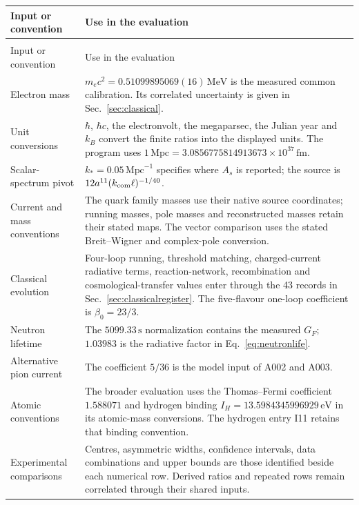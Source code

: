 \documentclass[aps,prx,onecolumn,10pt,notitlepage,nofootinbib,longbibliography]{revtex4-2}
\numberwithin{equation}{section}
\numberwithin{table}{section}
\newcommand{\MeV}{\,\mathrm{MeV}}
\newcommand{\eV}{\,\mathrm{eV}}
\newcommand{\fm}{\,\mathrm{fm}}
\begin{document}
\begingroup\small
\setlength{\tabcolsep}{4pt}
\setlength{\LTpre}{3pt}
\begin{longtable}{@{}>{\raggedright\arraybackslash}p{}>{\raggedright\arraybackslash}p{}@{}}
\toprule Input or convention&Use in the evaluation\\\midrule
\endfirsthead
\multicolumn{2}{l}{\textit{Input record, continued}}\\
\toprule Input or convention&Use in the evaluation\\\midrule
\endhead
\bottomrule\endfoot
Electron mass&$m_ec^2=0.51099895069(16)\MeV$ is the measured common calibration. Its correlated uncertainty is given in Sec.~\ref{sec:classical}.\\[3pt]
Unit conversions&$\hbar$, $\hbar c$, the electronvolt, the megaparsec, the Julian year and $k_B$ convert the finite ratios into the displayed units. The program uses $1\,\mathrm{Mpc}=3.0856775814913673\times10^{37}\fm$.\\[3pt]
Scalar-spectrum pivot&$k_*=0.05\,\mathrm{Mpc}^{-1}$ specifies where $A_s$ is reported; the source is $12a^{11}(k_{\rm com}\ell)^{-1/40}$.\\[3pt]
Current and mass conventions&The quark family masses use their native source coordinates; running masses, pole masses and reconstructed masses retain their stated maps. The vector comparison uses the stated Breit--Wigner and complex-pole conversion.\\[3pt]
Classical evolution&Four-loop running, threshold matching, charged-current radiative terms, reaction-network, recombination and cosmological-transfer values enter through the 43 records in Sec.~\ref{sec:classicalregister}. The five-flavour one-loop coefficient is $\beta_0=23/3$.\\[3pt]
Neutron lifetime&The $5099.33\,\mathrm s$ normalization contains the measured $G_F$; $1.03983$ is the radiative factor in Eq.~\eqref{eq:neutronlife}.\\[3pt]
Alternative pion current&The coefficient $5/36$ is the model input of A002 and A003.\\[3pt]
Atomic conventions&The broader evaluation uses the Thomas--Fermi coefficient $1.588071$ and hydrogen binding $I_H=13.5984345996929\eV$ in its atomic-mass conversions. The hydrogen entry I11 retains that binding convention.\\[3pt]
Experimental comparisons&Centres, asymmetric widths, confidence intervals, data combinations and upper bounds are those identified beside each numerical row. Derived ratios and repeated rows remain correlated through their shared inputs.\\
\end{longtable}
\endgroup
\end{document}
